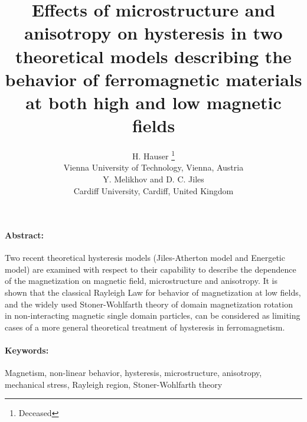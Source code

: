 \documentclass[12pt,fleqn]{article}
\begin{document}


\thispagestyle{empty}

\title
{\bf
   Effects of microstructure and anisotropy on hysteresis in two theoretical
    models describing the behavior of ferromagnetic materials at both high
                            and low magnetic fields
\\[0.5cm]
}
\author
{
               H. Hauser \footnote{Deceased}
\\
\normalsize
               Vienna University of Technology, Vienna, Austria
\\[0.5cm]
               Y. Melikhov and D. C. Jiles
\\
\normalsize
               Cardiff University, Cardiff, United Kingdom
\\
}
\date{} %

\maketitle
\thispagestyle{empty}

\cleardoublepage

\paragraph{Abstract:}

Two recent theoretical hysteresis models (Jiles-Atherton model and Energetic model) are examined with respect to their capability to describe the dependence of the magnetization on magnetic field, microstructure and anisotropy. It is shown that the classical Rayleigh Law for behavior of magnetization at low fields, and the widely used Stoner-Wohlfarth theory of domain magnetization rotation in non-interacting magnetic single domain particles, can be considered as limiting cases of a more general theoretical treatment of hysteresis in ferromagnetism.

\paragraph{Keywords:} Magnetism, non-linear behavior, hysteresis, microstructure, anisotropy, mechanical stress, Rayleigh region, Stoner-Wohlfarth theory

\cleardoublepage


\end{document}
